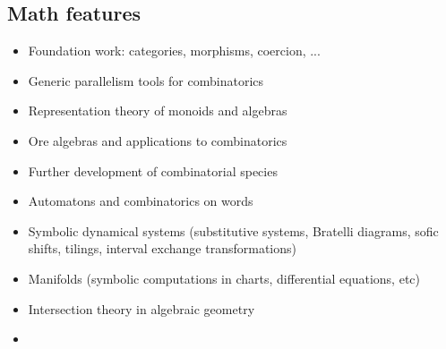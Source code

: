 
\subsection{Math features}

\begin{itemize}
\item Foundation work: categories, morphisms, coercion, ...
\item Generic parallelism tools for combinatorics
\item Representation theory of monoids and algebras
\item Ore algebras and applications to combinatorics
\item Further development of combinatorial species
\item Automatons and combinatorics on words
\item Symbolic dynamical systems (substitutive systems, Bratelli diagrams,
  sofic shifts, tilings, interval exchange transformations)
\item Manifolds (symbolic computations in charts, differential equations, etc)
\item Intersection theory in algebraic geometry
\item {}
\end{itemize}

